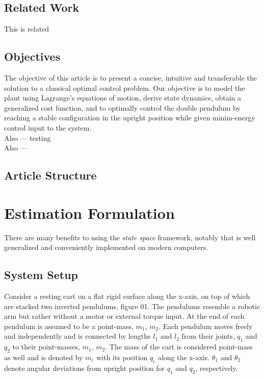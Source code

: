 \documentclass[journal]{IEEEtran}
\begin{document}
\subsection{Related Work}
This is related \\

\subsection{Objectives}
The objective of this article is to present a concise, intuitive and transferable
the solution to a classical optimal control problem.
Our objective is to model the plant using Lagrange's equations of motion,
derive state dynamics, obtain a generalized cost function, and to optimally
control the double pendulum by reaching a stable configuration in the upright
position while given minim-energy control input to the system.\\
Also --- testing\\
Also ---\\

\subsection{Article Structure}



\section{Estimation Formulation}
There are many benefits to using the \emph{state space} framework, notably that
is well generalized and conveniently implemented on modern computers.

\subsection{System Setup}
Consider a resting cart on a flat rigid surface along the x-axis, on top of
which are stacked two inverted pendulums, figure 01. The pendulums resemble a
robotic arm but rather without a motor or external torque input. At the end of
each pendulum is assumed to be a point-mass, \(m_1\), \(m_2\). Each pendulum
moves freely and independently and is connected by lengths \(l_1\) and \(l_2\)
from their joints, \(q_1\) and \(q_2\) to their point-masses, \(m_1\),
\(m_2\). The mass of the cart is considered point-mass as well and is denoted
by \(m_c\) with its position \(q_c\) along the x-axis. \(\theta_1\) and
\(\theta_2\) denote angular deviations from upright position for \(q_1\) and
\(q_2\), respectively.
\end{document}
